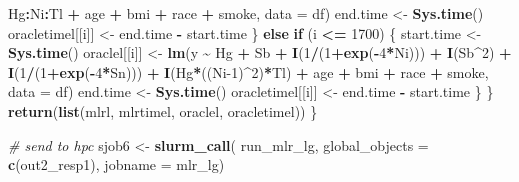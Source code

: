 \documentclass[12pt, twoside]{amherstthesis}
\newenvironment{Shaded}{\begin{snugshade}}{\end{snugshade}}
\newcommand{\AttributeTok}[1]{\textcolor[rgb]{0.13,0.29,0.53}{#1}}
\newcommand{\CommentTok}[1]{\textcolor[rgb]{0.56,0.35,0.01}{\textit{#1}}}
\newcommand{\ControlFlowTok}[1]{\textcolor[rgb]{0.13,0.29,0.53}{\textbf{#1}}}
\newcommand{\DecValTok}[1]{\textcolor[rgb]{0.00,0.00,0.81}{#1}}
\newcommand{\FunctionTok}[1]{\textcolor[rgb]{0.13,0.29,0.53}{\textbf{#1}}}
\newcommand{\NormalTok}[1]{#1}
\newcommand{\OtherTok}[1]{\textcolor[rgb]{0.56,0.35,0.01}{#1}}
\newcommand{\SpecialCharTok}[1]{\textcolor[rgb]{0.81,0.36,0.00}{\textbf{#1}}}
\newcommand{\StringTok}[1]{\textcolor[rgb]{0.31,0.60,0.02}{#1}}
\begin{document}
\begin{Shaded}
\begin{Highlighting}[]
\NormalTok{                           Hg}\SpecialCharTok{:}\NormalTok{Ni}\SpecialCharTok{:}\NormalTok{Tl }\SpecialCharTok{+} 
\NormalTok{                           age }\SpecialCharTok{+}\NormalTok{ bmi }\SpecialCharTok{+}\NormalTok{ race }\SpecialCharTok{+}\NormalTok{ smoke, }\AttributeTok{data =}\NormalTok{ df)}
\NormalTok{      end.time }\OtherTok{\textless{}{-}} \FunctionTok{Sys.time}\NormalTok{()}
\NormalTok{      oracletimel[[i]] }\OtherTok{\textless{}{-}}\NormalTok{ end.time }\SpecialCharTok{{-}}\NormalTok{ start.time}
\NormalTok{    \} }\ControlFlowTok{else} \ControlFlowTok{if}\NormalTok{ (i }\SpecialCharTok{\textless{}=} \DecValTok{1700}\NormalTok{) \{}
\NormalTok{      start.time }\OtherTok{\textless{}{-}} \FunctionTok{Sys.time}\NormalTok{()}
\NormalTok{      oraclel[[i]] }\OtherTok{\textless{}{-}} \FunctionTok{lm}\NormalTok{(y }\SpecialCharTok{\textasciitilde{}}\NormalTok{ Hg }\SpecialCharTok{+}\NormalTok{ Sb }\SpecialCharTok{+}
                           \FunctionTok{I}\NormalTok{(}\DecValTok{1}\SpecialCharTok{/}\NormalTok{(}\DecValTok{1}\SpecialCharTok{+}\FunctionTok{exp}\NormalTok{(}\SpecialCharTok{{-}}\DecValTok{4}\SpecialCharTok{*}\NormalTok{Ni))) }\SpecialCharTok{+} \FunctionTok{I}\NormalTok{(Sb}\SpecialCharTok{\^{}}\DecValTok{2}\NormalTok{) }\SpecialCharTok{+} \FunctionTok{I}\NormalTok{(}\DecValTok{1}\SpecialCharTok{/}\NormalTok{(}\DecValTok{1}\SpecialCharTok{+}\FunctionTok{exp}\NormalTok{(}\SpecialCharTok{{-}}\DecValTok{4}\SpecialCharTok{*}\NormalTok{Sn))) }\SpecialCharTok{+}
                           \FunctionTok{I}\NormalTok{(Hg}\SpecialCharTok{*}\NormalTok{((Ni}\DecValTok{{-}1}\NormalTok{)}\SpecialCharTok{\^{}}\DecValTok{2}\NormalTok{)}\SpecialCharTok{*}\NormalTok{Tl) }\SpecialCharTok{+} 
\NormalTok{                           age }\SpecialCharTok{+}\NormalTok{ bmi }\SpecialCharTok{+}\NormalTok{ race }\SpecialCharTok{+}\NormalTok{ smoke, }\AttributeTok{data =}\NormalTok{ df)}
\NormalTok{      end.time }\OtherTok{\textless{}{-}} \FunctionTok{Sys.time}\NormalTok{()}
\NormalTok{      oracletimel[[i]] }\OtherTok{\textless{}{-}}\NormalTok{ end.time }\SpecialCharTok{{-}}\NormalTok{ start.time}
\NormalTok{    \}}
\NormalTok{  \}}
  \FunctionTok{return}\NormalTok{(}\FunctionTok{list}\NormalTok{(mlrl, mlrtimel, oraclel, oracletimel))}
\NormalTok{\}}

\CommentTok{\# send to hpc}
\NormalTok{sjob6 }\OtherTok{\textless{}{-}} \FunctionTok{slurm\_call}\NormalTok{(}
\NormalTok{  run\_mlr\_lg, }
  \AttributeTok{global\_objects =} \FunctionTok{c}\NormalTok{(}\StringTok{\textquotesingle{}out2\_resp1\textquotesingle{}}\NormalTok{),}
  \AttributeTok{jobname =} \StringTok{\textquotesingle{}mlr\_lg\textquotesingle{}}\NormalTok{)}


\end{Highlighting}
\end{Shaded}
\end{document}

